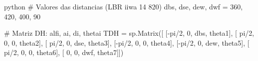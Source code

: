 \begin{mintedbox}{python}
# Valores das distancias (LBR iiwa 14 820)
dbs, dse, dew, dwf = 360, 420, 400, 90

# Matriz DH:        alfi, ai, di, thetai
TDH = sp.Matrix([ [-pi/2, 0, dbs, theta1],
                  [ pi/2, 0,   0, theta2],
                  [ pi/2, 0, dse, theta3],
                  [-pi/2, 0,   0, theta4],
                  [-pi/2, 0, dew, theta5],
                  [ pi/2, 0,   0, theta6],
                  [    0, 0, dwf, theta7]])
\end{mintedbox}